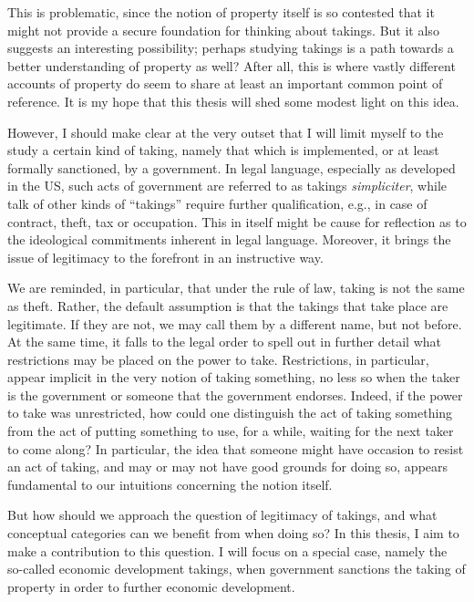 This is problematic, since the notion of property itself is so contested that it might not provide a secure foundation for thinking about takings. But it also suggests an interesting possibility; perhaps studying takings is a path towards a better understanding of property as well? After all, this is where vastly different accounts of property do seem to share at least an important common point of reference.
It is my hope that this thesis will shed some modest light on this idea.

However, I should make clear at the very outset that I will limit myself to the study a certain kind of taking, namely that which is implemented, or at least formally sanctioned, by a government. In legal language, especially as developed in the US, such acts of government are referred to as takings {\it simpliciter}, while talk of other kinds of ``takings'' require further qualification, e.g., in case of contract, theft, tax or occupation. This in itself might be cause for reflection as to the ideological commitments inherent in legal language. Moreover, it brings the issue of legitimacy to the forefront in an instructive way.

We are reminded, in particular, that under the rule of law, taking is not the same as theft. Rather, the default assumption is that the takings that take place are legitimate. If they are not, we may call them by a different name, but not before. At the same time, it falls to the legal order to spell out in further detail what restrictions may be placed on the power to take. Restrictions, in particular, appear implicit in the very notion of taking something, no less so when the taker is the government or someone that the government endorses. Indeed, if the power to take was unrestricted, how could one distinguish the act of taking something from the act of putting something to use, for a while, waiting for the next taker to come along? In particular, the idea that someone might have occasion to resist an act of taking, and may or may not have good grounds for doing so, appears fundamental to our intuitions concerning the notion itself.

But how should we approach the question of legitimacy of takings, and what conceptual categories can we benefit from when doing so? In this thesis, I aim to make a contribution to this question. I will focus on a special case, namely the so-called economic development takings, when government sanctions the taking of property in order to further economic development.

